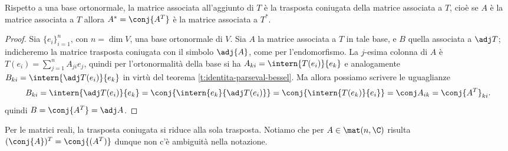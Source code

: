\begin{teorema} \label{t:matrice-aggiunta}
	Rispetto a una base ortonormale, la matrice associata all'aggiunto di $T$ è la trasposta coniugata della matrice associata a $T$, cioè se $A$ è la matrice associata a $T$ allora $A^*=\conj{A^T}$ è la matrice associata a $T^*$.
\end{teorema}
\begin{proof}
	Sia $\{e_i\}_{i=1}^n$, con $n=\dim V$, una base ortonormale di $V$.
	Sia $A$ la matrice associata a $T$ in tale base, e $B$ quella associata a $\adj T$; indicheremo la matrice trasposta coniugata con il simbolo $\adj{A}$, come per l'endomorfismo.
	La $j$-esima colonna di $A$ è $T(e_i)=\sum_{j=1}^nA_{ji}e_j$, quindi per l'ortonormalità della base si ha $A_{ki}=\intern{T(e_i)}{e_k}$ e analogamente $B_{ki}=\intern{\adj T(e_i)}{e_k}$ in virtù del teorema \ref{t:identita-parseval-bessel}.
	Ma allora possiamo scrivere le uguaglianze
	\begin{equation}
	 	B_{ki}=\intern{\adj T(e_i)}{e_k}=\conj{\intern{e_k}{\adj T(e_i)}}=\conj{\intern{T(e_k)}{e_i}}=\conj A_{ik}=\conj{A^T}_{ki}.
	\end{equation}
	quindi $B=\conj{A^T}=\adj A$.
\end{proof}
Per le matrici reali, la trasposta coniugata si riduce alla sola trasposta.
Notiamo che per $A\in\mat(n,\C)$ risulta $(\conj{A})^T=\conj{(A^T)}$ dunque non c'è ambiguità nella notazione.

